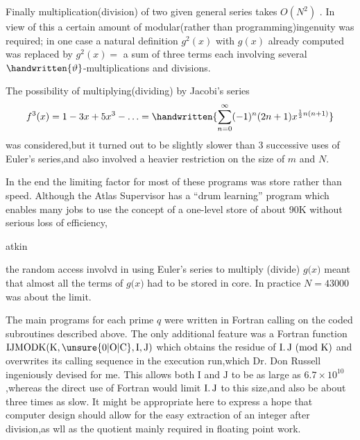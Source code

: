 Finally multiplication(division) of two given general series takes $O(N^{2})$ . In view of this a certain amount of modular(rather than programming)ingenuity was required; in one case a natural definition $g^{2}(x)$ with $g(x)$ already computed was replaced by $g^{2}(x)=$ a sum of three terms each involving several $\handwritten{\vartheta}$-multiplications and divisions.

The possibility of multiplying(dividing) by Jacobi's series
\[
f^{3}(x)=1-3x+5x^{3}-\ldots=\handwritten{\sum_{n=0}^{\infty}(-1)^{n}(2n+1)x^{\frac12 n(n+1)}}
\]
was considered,but it turned out to be slightly slower than 3 successive uses of Euler's series,and also involved a heavier restriction on the size of $m$ and $N$.

In the end the limiting factor for most of these programs was store rather than speed. Although the Atlas Supervisor has a ``drum learning'' program which enables many jobs to use the concept of a one-level store of about 90K without serious loss of efficiency,
\normalmarginpar
\begin{flushright}
atkin 
\end{flushright}

\reversemarginpar the random access involv\margin{\handwritten{/}}d in using Euler's series to multiply (divide) \uline{$g(x$}$)$ meant that almost all the terms of \uline{$g(x$}$)$ had to be stored in core. In practice $N=43000$ was about the limit.

The main programs for each prime \uline{$q$} were written in Fortran calling on the coded subroutines described above. The only additional feature was a Fortran function $\mathrm{IJMODK}(\mathrm{K},\unsure{0|\mathrm{O}|\mathrm{C}},\mathrm{I},\mathrm{J})$ which obtains the residue of $\mathrm{I}\ldotp\mathrm{J}\ (\mathrm{mod}\ \mathrm{K})$ and overwrites its calling sequence in the\normalmarginpar{} execution run,which Dr. Don Russell ingeniously devised for me. This allows both $\mathrm{I}$ and $\mathrm{J}$ to be as large as $6.7\times10^{10}$,whereas the direct use of Fortran would limit $\mathrm{I}\ldotp\mathrm{J}$ to this size,and also be about three times as slow. It might be appropriate here to express a hope that computer design should allow for the easy extraction of an integer \uline{} after division,as \reversemarginpar w\margin{\handwritten{/}}ll as the quotient mainly required in floating point work.

